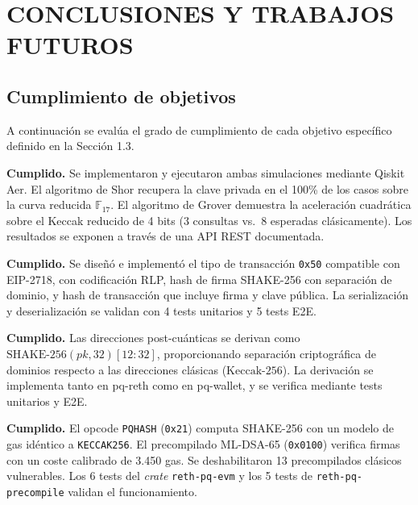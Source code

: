 \chapter{CONCLUSIONES Y TRABAJOS FUTUROS}
\label{cap:conclusiones}


\section{Cumplimiento de objetivos}
\label{sec:obj_cumplimiento}

A continuación se evalúa el grado de cumplimiento de cada objetivo específico definido en la Sección 1.3.

\begin{description}[style=nextline, leftmargin=3em]
  \item[\textbf{OE1} --- Simulación cuántica de Shor y Grover.] \textbf{Cumplido.} Se implementaron y ejecutaron ambas simulaciones mediante Qiskit Aer. El algoritmo de Shor recupera la clave privada en el 100\% de los casos sobre la curva reducida $\mathbb{F}_{17}$. El algoritmo de Grover demuestra la aceleración cuadrática sobre el Keccak reducido de 4 bits (3 consultas vs.\ 8 esperadas clásicamente). Los resultados se exponen a través de una API REST documentada.
  
  \item[\textbf{OE2} --- Tipo de transacción PQ (\texttt{0x50}).] \textbf{Cumplido.} Se diseñó e implementó el tipo de transacción \texttt{0x50} compatible con EIP-2718, con codificación RLP, hash de firma SHAKE-256 con separación de dominio, y hash de transacción que incluye firma y clave pública. La serialización y deserialización se validan con 4 tests unitarios y 5 tests E2E.
  
  \item[\textbf{OE3} --- Derivación de direcciones PQ.] \textbf{Cumplido.} Las direcciones post-cuánticas se derivan como $\text{SHAKE-256}(\mathit{pk}, 32)[12{:}32]$, proporcionando separación criptográfica de dominios respecto a las direcciones clásicas ($\text{Keccak-256}$). La derivación se implementa tanto en pq-reth como en pq-wallet, y se verifica mediante tests unitarios y E2E.
  
  \item[\textbf{OE4} --- Opcode PQHASH y precompilado ML-DSA.] \textbf{Cumplido.} El opcode \texttt{PQHASH} (\texttt{0x21}) computa SHAKE-256 con un modelo de gas idéntico a \texttt{KECCAK256}. El precompilado ML-DSA-65 (\texttt{0x0100}) verifica firmas con un coste calibrado de 3.450 gas. Se deshabilitaron 13 precompilados clásicos vulnerables. Los 6 tests del \emph{crate} \texttt{reth-pq-evm} y los 5 tests de \texttt{reth-pq-precompile} validan el funcionamiento.
  

\end{description}
